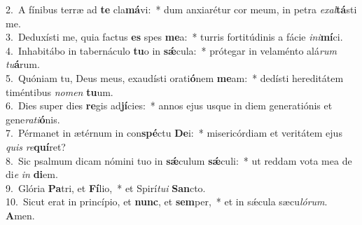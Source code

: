 {2.~}A fínibus terræ ad \textbf{te} cla\textbf{má}vi:~* dum anxiarétur cor meum, in petra \textit{e}\textit{xal}\textbf{tá}sti me.\\
{3.~}Deduxísti me, quia factus \textbf{es} spes \textbf{me}a:~* turris fortitúdinis a fácie \textit{i}\textit{ni}\textbf{mí}ci.\\
{4.~}Inhabitábo in tabernáculo \textbf{tu}o in \textbf{sǽ}cula:~* prótegar in velaménto alá\textit{rum} \textit{tu}\textbf{á}rum.\\
{5.~}Quóniam tu, Deus meus, exaudísti orati\textbf{ó}nem \textbf{me}am:~* dedísti hereditátem timéntibus \textit{no}\textit{men} \textbf{tu}um.\\
{6.~}Dies super dies \textbf{re}gis ad\textbf{jí}cies:~* annos ejus usque in diem generatiónis et gene\textit{ra}\textit{ti}\textbf{ó}nis.\\
{7.~}Pérmanet in ætérnum in con\textbf{spé}ctu \textbf{De}i:~* misericórdiam et veritátem ejus \textit{quis} \textit{re}\textbf{quí}ret?\\
{8.~}Sic psalmum dicam nómini tuo in \textbf{sǽ}culum \textbf{sǽ}culi:~* ut reddam vota mea de di\textit{e} \textit{in} \textbf{di}em.\\
{9.~}Glória \textbf{Pa}tri, et \textbf{Fí}lio,~* et Spirí\textit{tu}\textit{i} \textbf{San}cto.\\
{10.~}Sicut erat in princípio, et \textbf{nunc}, et \textbf{sem}per,~* et in sǽcula sæcu\textit{ló}\textit{rum}. \textbf{A}men.\\
